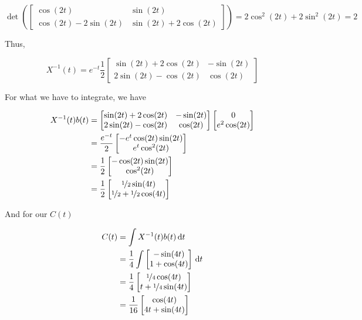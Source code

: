 \begin{sol}
		\[\det\left(\begin{bmatrix}
				\cos(2t) & \sin(2t)\\
				\cos(2t) - 2\sin(2t) & \sin(2t) + 2\cos(2t)
			\end{bmatrix}\right) = 2\cos^2(2t) + 2\sin^2(2t) = 2\]
		
		Thus,

		\[X^{-1}(t) = e^{-t} \frac{1}{2} \begin{bmatrix}
			\sin(2t) + 2\cos(2t) & -\sin(2t)\\
			2\sin(2t) - \cos(2t) & \cos(2t)
		\end{bmatrix}\]

		For what we have to integrate, we have

		\begin{align}
			X^{-1}(t)b(t) &= \begin{bmatrix}
				\sin(2t) + 2\cos(2t) & -\sin(2t)\\
				2\sin(2t) - \cos(2t) & \cos(2t)
			\end{bmatrix} \begin{bmatrix}
				0\\e^2\cos(2t)
			\end{bmatrix}\\
			&= \frac{e^{-t}}{2} \begin{bmatrix}
				-e^t\cos(2t)\sin(2t)\\
				e^t \cos^2(2t)
			\end{bmatrix}\\
			&= \frac{1}{2} \begin{bmatrix}
				-\cos(2t)\sin(2t)\\
				\cos^2(2t)
			\end{bmatrix}\\
			&= \frac{1}{2} \begin{bmatrix}
				\nicefrac{1}{2}\sin(4t)\\
				\nicefrac{1}{2} + \nicefrac{1}{2} \cos(4t)
			\end{bmatrix}
		\end{align}

		And for our $C(t)$

		\begin{align}
			C(t) &= \int X^{-1}(t)b(t) \D t\\
			&= \frac{1}{4} \int \begin{bmatrix}
				-\sin(4t)\\
				1 + \cos(4t)
			\end{bmatrix} \D t\\
			&= \frac{1}{4} \begin{bmatrix}
				\nicefrac{1}{4} \cos(4t)\\t + \nicefrac{1}{4} \sin(4t)
			\end{bmatrix}\\
			&= \frac{1}{16} \begin{bmatrix}
				\cos(4t)\\
				4t + \sin(4t)
			\end{bmatrix}
		\end{align}


\end{sol}
